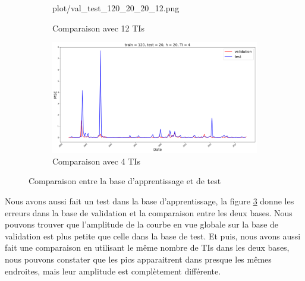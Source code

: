 \begin{figure}[H]
\begin{subfigure}{.5\textwidth}
	{plot/val_test_120_20_20_12.png}
	\caption{Comparaison avec 12 TIs}
	\label{fig:val_test_12}
	\end{subfigure}%
	\begin{subfigure}{.5\textwidth}
	\centering
	\includegraphics[width=.9\linewidth, scale=0.2]
	{plot/val_test_120_20_20_4.png}
	\caption{Comparaison avec 4 TIs}
	\label{fig:val_test_4}
	\end{subfigure}	
\caption{Comparaison entre la base d'apprentissage et de test}
\label{fig:val_test_TI}
\end{figure}

Nous avons aussi fait un test dans la base d'apprentissage, la figure \ref{fig:val_test_TI} donne les erreurs dans la base de validation et la comparaison entre les deux bases. Nous pouvons trouver que l'amplitude de la courbe en vue globale sur la base de validation est plus petite que celle dans la base de test. Et puis, nous avons aussi fait une comparaison en utilisant le même nombre de TIs dans les deux bases, nous pouvons constater que les pics apparaitrent dans presque les mêmes endroites, mais leur amplitude est complètement différente.




